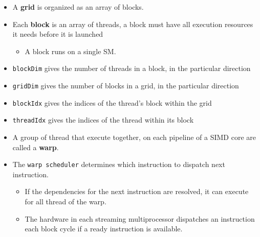 \documentclass[../main.tex]{subfiles}
\begin{document}
\begin{itemize}
	\item A \textbf{grid} is organized as an array of blocks.
	\item Each \textbf{block} is an array of threads, a block must have all execution resources it needs before it is launched
	      \begin{itemize}
		      \item A block runs on a single SM.
	      \end{itemize}
	\item \texttt{blockDim} gives the number of threads in a block, in the particular direction
	\item \texttt{gridDim} gives the number of blocks in a grid, in the particular direction
	\item \texttt{blockIdx} gives the indices of the thread's block within the grid
	\item \texttt{threadIdx} gives the indices of the thread within its block
	\item A group of thread that execute together, on each pipeline of a SIMD core are called a \textbf{warp}.
	\item The \texttt{warp scheduler} determines which instruction to dispatch next instruction.
	      \begin{itemize}
		      \item If the dependencies for the next instruction are resolved, it can execute for all thread of the warp.
		      \item The hardware in each streaming multiprocessor dispatches an instruction each block cycle if a ready instruction is available.
	      \end{itemize}
\end{itemize}


\end{document}

